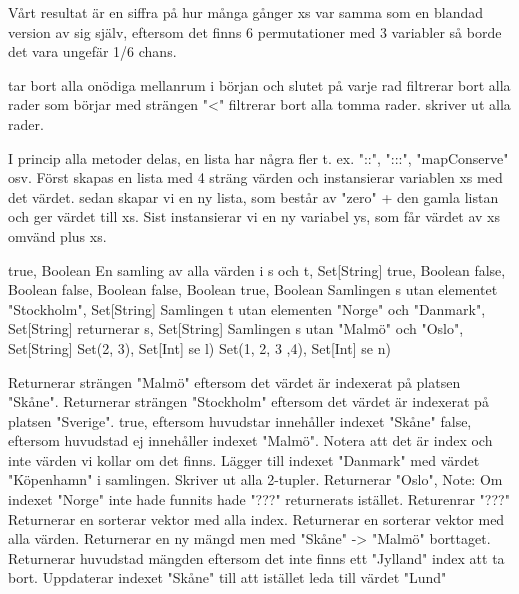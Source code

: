 Vårt resultat är en siffra på hur många gånger xs var samma som en blandad version av sig själv, eftersom det finns 6 permutationer med 3 variabler så borde det vara ungefär 1/6 chans.

\Subtask 
{} tar bort alla onödiga mellanrum i början och slutet på varje rad
 filtrerar bort alla rader som börjar med strängen "<"
 filtrerar bort alla tomma rader.
 skriver ut alla rader.

\Task %
\Subtask 
I princip alla metoder delas, en lista har några fler t. ex. "::", ":::", "mapConserve" osv.
\Subtask 
Först skapas en lista med 4 sträng värden och instansierar variablen xs med det värdet.
sedan skapar vi en ny lista, som består av "zero" + den gamla listan och ger värdet till xs.
Sist instansierar vi en ny variabel ys, som får värdet av xs omvänd plus xs.

\Task %
\Subtask 
true, Boolean
\Subtask 
En samling av alla värden i s och t, Set[String]
\Subtask 
true, Boolean
\Subtask 
false, Boolean
\Subtask 
false, Boolean
\Subtask 
false, Boolean
\Subtask 
true, Boolean
\Subtask 
Samlingen s utan elementet "Stockholm", Set[String]
\Subtask 
Samlingen t utan elementen "Norge" och "Danmark", Set[String]
\Subtask 
returnerar s, Set[String]
\Subtask 
Samlingen s utan "Malmö" och "Oslo", Set[String]
\Subtask 
Set(2, 3), Set[Int]
\Subtask 
se l)
\Subtask 
Set(1, 2, 3 ,4), Set[Int]
\Subtask 
se n)

\Task %
\Subtask 
Returnerar strängen "Malmö" eftersom det värdet är indexerat på platsen "Skåne".
\Subtask 
Returnerar strängen "Stockholm" eftersom det värdet är indexerat på platsen "Sverige".
\Subtask 
true, eftersom huvudstar innehåller indexet "Skåne"
\Subtask 
false, eftersom huvudstad ej innehåller indexet "Malmö". Notera att det är index och inte värden vi kollar om det finns.
\Subtask 
Lägger till indexet "Danmark" med värdet "Köpenhamn" i samlingen.
\Subtask 
Skriver ut alla 2-tupler.
\Subtask 
Returnerar "Oslo", Note: Om indexet "Norge" inte hade funnits hade "???" returnerats istället.
\Subtask 
Returenrar "???"
\Subtask 
Returnerar en sorterar vektor med alla index.
\Subtask 
Returnerar en sorterar vektor med alla värden.
\Subtask 
Returnerar en ny mängd men med "Skåne" -> "Malmö" borttaget. 
\Subtask 
Returnerar huvudstad mängden eftersom det inte finns ett "Jylland" index att ta bort.
\Subtask 
Uppdaterar indexet "Skåne" till att istället leda till värdet "Lund"

